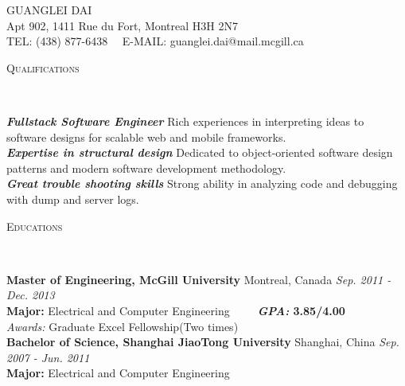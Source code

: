 \documentclass[11pt]{article}
\newenvironment{changemargin}[2]{%
  \begin{list}{}{%
    \setlength{\topsep}{0pt}%
    \setlength{\leftmargin}{#1}%
    \setlength{\rightmargin}{#2}%
    \setlength{\listparindent}{\parindent}%
    \setlength{\itemindent}{\parindent}%
    \setlength{\parsep}{\parskip}%
  }%
  \item[]}{\end{list}
}
\newcommand{\lineover}{
	\begin{changemargin}{-0.05in}{-0.05in}
		\vspace*{-8pt}
		\hrulefill \\
		\vspace*{-2pt}
	\end{changemargin}
}
\newcommand{\header}[1]{
	\begin{changemargin}{-0.5in}{-0.5in}
		\scshape{#1}\\
  	\lineover
	\end{changemargin}
}
\newcommand{\contact}[4]{
	\begin{changemargin}{-0.5in}{-0.5in}
		\begin{center}
			{\Large \scshape {#1}}\\ \smallskip
			{#2}\\ \smallskip
			{#3}\\ \smallskip
			{#4}\smallskip
		\end{center}
	\end{changemargin}
}
\newenvironment{body} {
	\vspace*{-16pt}
	\begin{changemargin}{-0.25in}{-0.5in}
  }	
	{\end{changemargin}
}
\begin{document}
\small
\contact{GUANGLEI DAI}{Apt 902, 1411 Rue du Fort,
Montreal H3H 2N7}{TEL: (438) 877-6438~~ E-MAIL: guanglei.dai@mail.mcgill.ca}
\smallskip
\header{Qualifications}
\begin{body}
	\vspace{14pt}
	\emph{\textbf{Fullstack Software Engineer}}{} {Rich experiences in interpreting ideas to software designs for scalable web and mobile frameworks.} \\
	\medskip
	\emph{\textbf{Expertise in structural design}}{} {Dedicated to object-oriented software design patterns and modern software development methodology.} \\
	\medskip
	\emph{\textbf{Great trouble shooting skills}}{} {Strong ability in analyzing code and debugging with dump and server logs.} \\
\end{body}
\smallskip

\header{Educations}
\begin{body}
	\vspace{14pt}
	\textbf{Master of Engineering, McGill University} {Montreal, Canada}   \hfill \emph{Sep. 2011 - Dec. 2013}{}  \\
	\textbf{Major:} Electrical and Computer Engineering~~~~~\textbf{\emph{GPA:} 3.85/4.00} \\
	\emph{Awards:} Graduate Excel Fellowship(Two times)\\

  \medskip	  
	\textbf{Bachelor of Science, Shanghai JiaoTong University} {Shanghai, China}   \hfill \emph{Sep. 2007 - Jun. 2011} \\
	\textbf{Major:} Electrical and Computer Engineering ~~~~~ \\
\end{body}
\smallskip
\end{document}
